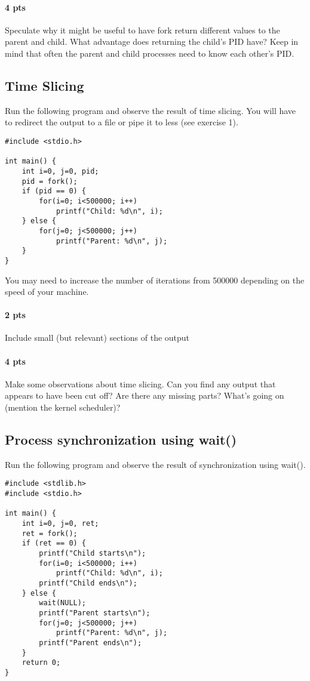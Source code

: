 \documentclass[letterpaper,10pt]{article}
\begin{document}
\paragraph{4 pts} Speculate why it might be useful to have fork return different values to the parent and child. What advantage does returning the child's PID have?
Keep in mind that often the parent and child processes need to know each other's PID.

\subsection{Time Slicing}
Run the following program and observe the result of time slicing. You will have to redirect
the output to a file or pipe it to less (see exercise 1).
\begin{verbatim}
#include <stdio.h>

int main() {
    int i=0, j=0, pid;
    pid = fork();
    if (pid == 0) {
        for(i=0; i<500000; i++)
            printf("Child: %d\n", i);
    } else {
        for(j=0; j<500000; j++)
            printf("Parent: %d\n", j);
    }
}
\end{verbatim}
You may need to increase the number of iterations from 500000 depending on the speed of your machine.

\paragraph{2 pts} Include small (but relevant) sections of the output
\paragraph{4 pts} Make some observations about time slicing. Can you find any output that appears to
have been cut off? Are there any missing parts? What's going on (mention the kernel scheduler)?

\subsection{Process synchronization using wait()}
Run the following program and observe the result of synchronization using wait().
\begin{verbatim}
#include <stdlib.h>
#include <stdio.h>

int main() {
    int i=0, j=0, ret;
    ret = fork();
    if (ret == 0) {
        printf("Child starts\n");
        for(i=0; i<500000; i++)
            printf("Child: %d\n", i);
        printf("Child ends\n");
    } else {
        wait(NULL);
        printf("Parent starts\n");
        for(j=0; j<500000; j++)
            printf("Parent: %d\n", j);
        printf("Parent ends\n");
    }
    return 0;
}
\end{verbatim}
\end{document}

